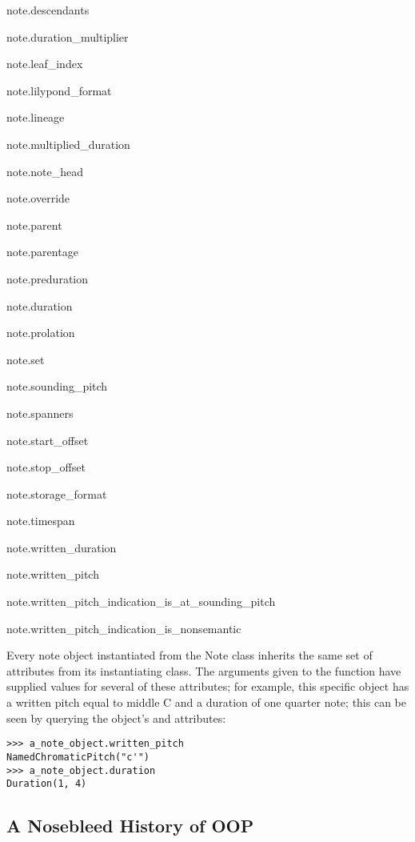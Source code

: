 \begin{scriptsize}
\begin{ttfamily}
note.descendants

note.duration\_multiplier

note.leaf\_index

note.lilypond\_format

note.lineage

note.multiplied\_duration

note.note\_head

note.override

note.parent

note.parentage

note.preduration

note.duration

note.prolation

note.set

note.sounding\_pitch

note.spanners

note.start\_offset

note.stop\_offset

note.storage\_format

note.timespan

note.written\_duration

note.written\_pitch

note.written\_pitch\_indication\_is\_at\_sounding\_pitch

note.written\_pitch\_indication\_is\_nonsemantic
\end{ttfamily}
\end{scriptsize}

\noindent Every note object instantiated from the Note class inherits the same set of attributes from its instantiating class. The arguments given to the  function have supplied values for several of these attributes; for example, this specific object has a written pitch equal to middle C and a duration of one quarter note; this can be seen by querying the object's  and  attributes:

\begin{lstlisting}[basicstyle=\scriptsize\ttfamily, breaklines=True, tabsize=4, showtabs=false, showspaces=false]
>>> a_note_object.written_pitch
NamedChromaticPitch("c'")
>>> a_note_object.duration
Duration(1, 4)\end{lstlisting}

\subsection{A Nosebleed History of OOP}
